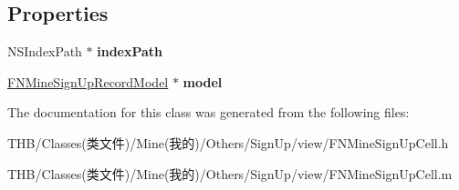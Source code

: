\subsection*{Properties}
\begin{DoxyCompactItemize}
\item 
\mbox{\label{interface_f_n_mine_sign_up_cell_aeccb0c6f1e6556c08596a6a748005691}} 
N\+S\+Index\+Path $\ast$ {\bfseries index\+Path}
\item 
\mbox{\label{interface_f_n_mine_sign_up_cell_aaac39261e0b220a07ed61ac29549970e}} 
\mbox{\hyperlink{interface_f_n_mine_sign_up_record_model}{F\+N\+Mine\+Sign\+Up\+Record\+Model}} $\ast$ {\bfseries model}
\end{DoxyCompactItemize}


The documentation for this class was generated from the following files\+:\begin{DoxyCompactItemize}
\item 
T\+H\+B/\+Classes(类文件)/\+Mine(我的)/\+Others/\+Sign\+Up/view/F\+N\+Mine\+Sign\+Up\+Cell.\+h\item 
T\+H\+B/\+Classes(类文件)/\+Mine(我的)/\+Others/\+Sign\+Up/view/F\+N\+Mine\+Sign\+Up\+Cell.\+m\end{DoxyCompactItemize}
